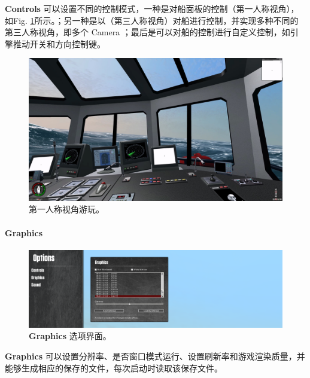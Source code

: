 \documentclass[letterpaper,10pt]{article}
\begin{document}
					\textbf{Controls} 可以设置不同的控制模式，一种是对船面板的控制（第一人称视角），如Fig. \ref{fig: First-person perspective}所示。；另一种是以（第三人称视角）对船进行控制，并实现多种不同的第三人称视角，即多个 Camera ；最后是可以对船的控制进行自定义控制，如引擎推动开关和方向控制键。
					
					\begin{figure}[htbp]
						\centering
						\includegraphics[width=\columnwidth]{picture/First-person perspective}
						\caption{
							\label{fig: First-person perspective} 
							第一人称视角游玩。
						}	
					\end{figure}
					
					
					\paragraph{Graphics}
					
					\begin{figure}[htbp]
						\centering 
						\includegraphics[width=0.7\columnwidth]{picture/Options_Graphics}
						\caption{
							\label{fig: Options_Graphics} 
							\textbf{Graphics} 选项界面。
						}	
					\end{figure}
					
					\textbf{Graphics} 可以设置分辨率、是否窗口模式运行、设置刷新率和游戏渲染质量，并能够生成相应的保存的文件，每次启动时读取该保存文件。
					
\end{document}
